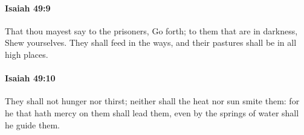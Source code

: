 		\paragraph{Isaiah 49:9} %
			\label{ISAIAH-49-9}

			That thou mayest say to the prisoners, Go forth; to them that are in darkness, Shew yourselves. They shall feed in the ways, and their pastures shall be in all high places.


		\paragraph{Isaiah 49:10} %
			\label{ISAIAH-49-10}

			They shall not hunger nor thirst; neither shall the heat nor sun smite them: for he that hath mercy on them shall lead them, even by the springs of water shall he guide them.


